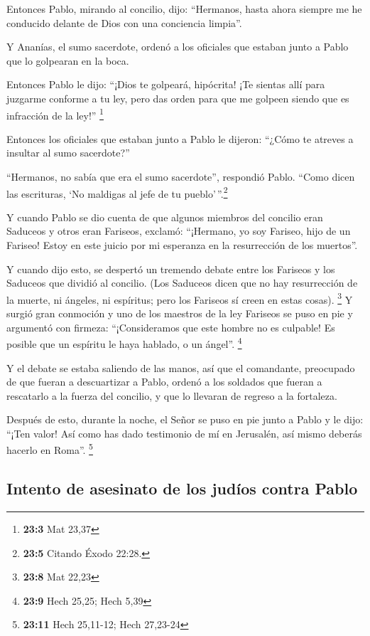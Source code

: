  Entonces Pablo, mirando al concilio, dijo: ``Hermanos,
hasta ahora siempre me he conducido delante de Dios con una conciencia
limpia''.

 Y Ananías, el sumo sacerdote, ordenó a los oficiales que
estaban junto a Pablo que lo golpearan en la boca.

 Entonces Pablo le dijo: ``¡Dios te golpeará, hipócrita!
¡Te sientas allí para juzgarme conforme a tu ley, pero das orden para
que me golpeen siendo que es infracción de la ley!'' \footnote{\textbf{23:3}
  Mat 23,37}

 Entonces los oficiales que estaban junto a Pablo le
dijeron: ``¿Cómo te atreves a insultar al sumo sacerdote?''

 ``Hermanos, no sabía que era el sumo sacerdote'',
respondió Pablo. ``Como dicen las escrituras, `No maldigas al jefe de tu
pueblo'\,''.\footnote{\textbf{23:5} Citando Éxodo 22:28.}

 Y cuando Pablo se dio cuenta de que algunos miembros del
concilio eran Saduceos y otros eran Fariseos, exclamó: ``¡Hermano, yo
soy Fariseo, hijo de un Fariseo! Estoy en este juicio por mi esperanza
en la resurrección de los muertos''.

 Y cuando dijo esto, se despertó un tremendo debate entre
los Fariseos y los Saduceos que dividió al concilio.  (Los
Saduceos dicen que no hay resurrección de la muerte, ni ángeles, ni
espíritus; pero los Fariseos sí creen en estas cosas). \footnote{\textbf{23:8}
  Mat 22,23}  Y surgió gran conmoción y uno de los
maestros de la ley Fariseos se puso en pie y argumentó con firmeza:
``¡Consideramos que este hombre no es culpable! Es posible que un
espíritu le haya hablado, o un ángel''. \footnote{\textbf{23:9} Hech
  25,25; Hech 5,39}

 Y el debate se estaba saliendo de las manos, así que el
comandante, preocupado de que fueran a descuartizar a Pablo, ordenó a
los soldados que fueran a rescatarlo a la fuerza del concilio, y que lo
llevaran de regreso a la fortaleza.

 Después de esto, durante la noche, el Señor se puso en
pie junto a Pablo y le dijo: ``¡Ten valor! Así como has dado testimonio
de mí en Jerusalén, así mismo deberás hacerlo en Roma''. \footnote{\textbf{23:11}
  Hech 25,11-12; Hech 27,23-24}

\hypertarget{intento-de-asesinato-de-los-juduxedos-contra-pablo}{%
\subsection{Intento de asesinato de los judíos contra
Pablo}\label{intento-de-asesinato-de-los-juduxedos-contra-pablo}}

